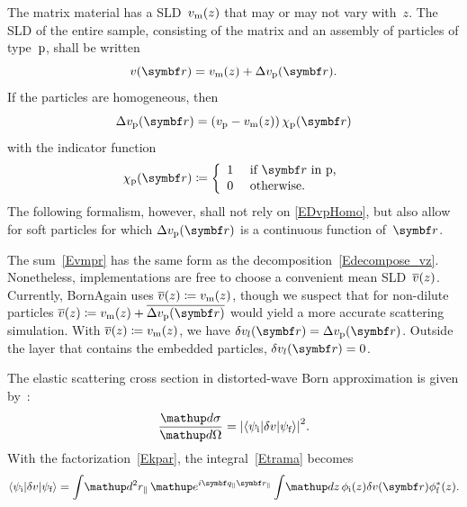 The matrix material has a SLD~$v_\sm(z)$
that may or may not vary with~$z$.
The SLD of the entire sample,
consisting of the matrix and an assembly of particles of type~$\sp$,
shall be written
\begin{equation}\label{Evmpr}
  v(\r) = v_\sm(z) + \Delta v_\sp(\r).
\end{equation}
If the particles are homogeneous, then
\begin{equation}\label{EDvpHomo}
  \Delta v_\sp(\r) = \left(v_\sp-v_\sm(z)\right)\chi_\sp(\r)
\end{equation}
with the indicator function
\begin{equation}\label{EdefChiP}
  \chi_\sp(\r)\coloneqq\left\{\begin{array}{ll}
  1&\text{~if $\r$ in p,}\\[.2ex]
  0&\text{~otherwise.} \end{array}\right.
\end{equation}
%
%
The following formalism, however, shall not rely on \cref{EDvpHomo},
but also allow for soft particles for which $\Delta v_\sp(\r)$ is a continuous function of~$\r$.

The sum~\cref{Evmpr} has the same form as the decomposition~\cref{Edecompose_vz}.
Nonetheless, implementations are free to choose a convenient mean SLD~$\mv(z)$.
Currently, BornAgain uses $\mv(z)\coloneqq v_\sm(z)$,
though we suspect that for non-dilute particles
$\mv(z)\coloneqq v_\sm(z) + \overline{\Delta v_\sp(\r)}$ would yield
a more accurate scattering simulation.
With $\mv(z)\coloneqq v_\sm(z)$, we have
$\delta v_l(\r) = \Delta v_\sp(\r)$.
Outside the layer that contains the embedded particles,
$\delta v_l(\r)=0$.

The elastic scattering cross section
in distorted-wave Born approximation
is given by~:
\begin{equation}\label{Exsection2}
  \frac{\d\sigma}{\d\Omega}
  =  {\left|\bra\psi_\ti|\delta v|\psi_\tf\ket\right|}^2.
\end{equation}
With the factorization~\cref{Ekpar},
the integral~\cref{Etrama} becomes
\begin{equation}
  \bra\psi_\ti|\delta v|\psi_\tf\ket
  = \int\!\d^2 r_\parallel\, \e^{i\q_\parallel \r_\parallel}
    \int\!\d z\, \phi_\si(z) \delta v(\r) \phi^*_\sf(z).
\end{equation}


